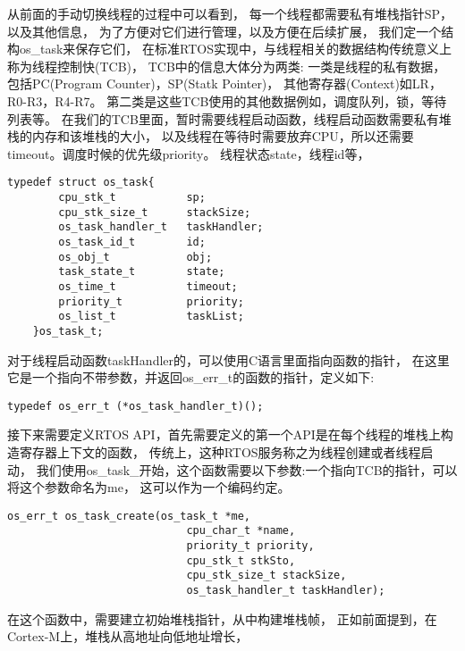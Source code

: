 从前面的手动切换线程的过程中可以看到，
每一个线程都需要私有堆栈指针SP，以及其他信息， 
为了方便对它们进行管理，以及方便在后续扩展，
我们定一个结构os\_task来保存它们，
在标准RTOS实现中，与线程相关的数据结构传统意义上称为线程控制快(TCB)，
TCB中的信息大体分为两类:
一类是线程的私有数据，包括PC(Program Counter)，SP(Statk Pointer)，
其他寄存器(Context)如LR，R0-R3，R4-R7。
第二类是这些TCB使用的其他数据例如，调度队列，锁，等待列表等。
在我们的TCB里面，暂时需要线程启动函数，线程启动函数需要私有堆栈的内存和该堆栈的大小，
以及线程在等待时需要放弃CPU，所以还需要timeout。调度时候的优先级priority。
线程状态state，线程id等，
\begin{lstlisting}[language={[ANSI]C},keywordstyle=\color{blue!70},commentstyle=\color{red!50!green!50!blue!50},frame=shadowbox, rulesepcolor=\color{red!20!green!20!blue!20}]
    typedef struct os_task{
        cpu_stk_t 		    sp;
        cpu_stk_size_t 		stackSize;
        os_task_handler_t   taskHandler;
        os_task_id_t 	    id;
        os_obj_t            obj;
        task_state_t 		state;
        os_time_t 		    timeout;
        priority_t 		    priority;
        os_list_t           taskList;
    }os_task_t;
\end{lstlisting}
对于线程启动函数taskHandler的，可以使用C语言里面指向函数的指针，
在这里它是一个指向不带参数，并返回os\_err\_t的函数的指针，定义如下:
\begin{lstlisting}[language={[ANSI]C},keywordstyle=\color{blue!70},commentstyle=\color{red!50!green!50!blue!50},frame=shadowbox, rulesepcolor=\color{red!20!green!20!blue!20}]
    typedef os_err_t (*os_task_handler_t)();
\end{lstlisting}
接下来需要定义RTOS API，首先需要定义的第一个API是在每个线程的堆栈上构造寄存器上下文的函数，
传统上，这种RTOS服务称之为线程创建或者线程启动，
我们使用os\_task\_开始，这个函数需要以下参数:一个指向TCB的指针，可以将这个参数命名为me，
这可以作为一个编码约定。
\begin{lstlisting}[language={[ANSI]C},keywordstyle=\color{blue!70},commentstyle=\color{red!50!green!50!blue!50},frame=shadowbox, rulesepcolor=\color{red!20!green!20!blue!20}]
    os_err_t os_task_create(os_task_t *me,
                            cpu_char_t *name, 
                            priority_t priority, 
                            cpu_stk_t stkSto, 
                            cpu_stk_size_t stackSize, 
                            os_task_handler_t taskHandler);
\end{lstlisting}
在这个函数中，需要建立初始堆栈指针，从中构建堆栈帧，
正如前面提到，在Cortex-M上，堆栈从高地址向低地址增长，
